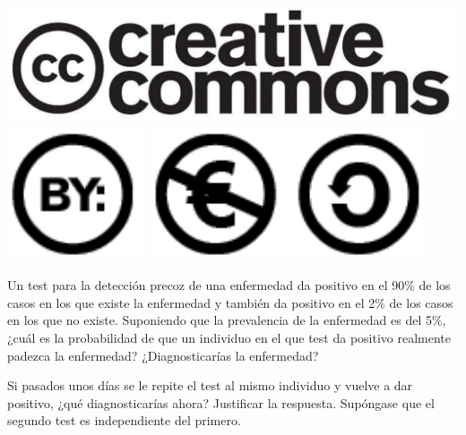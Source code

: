 \documentclass[aspectratio=149,10pt,xcolor=dvipsnames,t]{beamer}
\begin{document}
\begin{frame}[c]
\begin{center}
\biskip
\includegraphics[scale=0.07]{img/cc-logo}
\includegraphics[scale=0.2]{img/cc-by}
\includegraphics[scale=0.2]{img/cc-e}
\includegraphics[scale=0.2]{img/cc-c}
\end{center}
\end{frame}

\begin{frame}[c]
\large
Un test para la detección precoz de una enfermedad da positivo en el 90\% de los casos en los que existe
la enfermedad y también da positivo en el 2\% de los casos en los que no existe. 
Suponiendo que la prevalencia de la enfermedad es del 5\%, ¿cuál es la probabilidad de que un individuo en el que test
da positivo realmente padezca la enfermedad? ¿Diagnosticarías la enfermedad?

Si pasados unos días se le repite el test al mismo individuo y vuelve a dar positivo, ¿qué diagnosticarías ahora?
Justificar la respuesta. 
Supóngase que el segundo test es independiente del primero. 
\end{frame}
\end{document}
